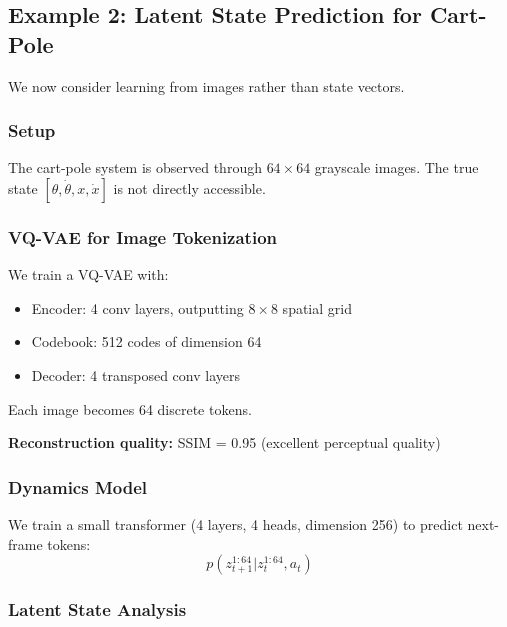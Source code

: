 
\subsection{Example 2: Latent State Prediction for Cart-Pole}

We now consider learning from images rather than state vectors.

\subsubsection{Setup}

The cart-pole system is observed through $64 \times 64$ grayscale images. The true state $[\theta, \dot{\theta}, x, \dot{x}]$ is not directly accessible.

\subsubsection{VQ-VAE for Image Tokenization}

We train a VQ-VAE with:
\begin{itemize}
    \item Encoder: 4 conv layers, outputting $8 \times 8$ spatial grid
    \item Codebook: 512 codes of dimension 64
    \item Decoder: 4 transposed conv layers
\end{itemize}

Each image becomes 64 discrete tokens.

\textbf{Reconstruction quality:} SSIM = 0.95 (excellent perceptual quality)

\subsubsection{Dynamics Model}

We train a small transformer (4 layers, 4 heads, dimension 256) to predict next-frame tokens:
\begin{equation}
p(z_{t+1}^{1:64} | z_t^{1:64}, a_t)
\end{equation}

\subsubsection{Latent State Analysis}

